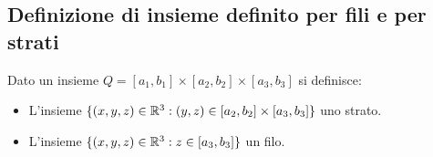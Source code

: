 \subsection{Definizione di insieme definito per fili e per strati}
\begin{definition}
  Dato un insieme $Q = [a_1,b_1] \times [a_2,b_2]\times[a_3,b_3]$ si definisce:
  \begin{itemize}
    \item L'insieme $\{(x,y,z)\in\mathbb{R}^3:(y,z)\in[a_2,b_2]\times[a_3,b_3]\}$ \ace uno strato.
    \item L'insieme $\{(x,y,z)\in\mathbb{R}^3: z\in[a_3,b_3]\}$ \ace un filo.
  \end{itemize}
\end{definition}
